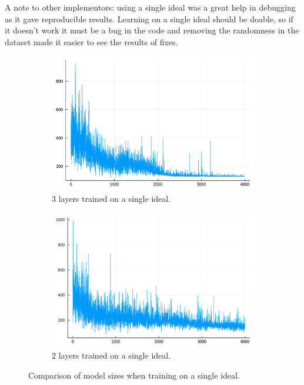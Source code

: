 \documentclass{article}
\theoremstyle{changedot}
\theoremstyle{changedotbreak}
\theoremstyle{nonumberplain}
\begin{document}
A note to other implementors: using a single ideal was a great help in debugging as it gave reproducible results. Learning on a single ideal should be doable, so if it doesn't work it must be a bug in the code and removing the randomness in the dataset made it easier to see the results of fixes. 

\begin{figure}
  \centering
  \begin{subfigure}[b]{0.49\textwidth}
    \centering
    \includegraphics[width=\textwidth]{rews_En3_4k_3layer.png}
    \caption{3 layers trained on a single ideal.}
    \label{subfig:three_layers}
  \end{subfigure}
  \hfill
  \begin{subfigure}[b]{0.49\textwidth}
    \centering
    \includegraphics[width=\textwidth]{rews_En3_4k_2layer.png}
    \caption{2 layers trained on a single ideal.}
  \end{subfigure}
  \caption{Comparison of model sizes when training on a single ideal.}
  \label{fig:single_ideal}
\end{figure}
\end{document}
